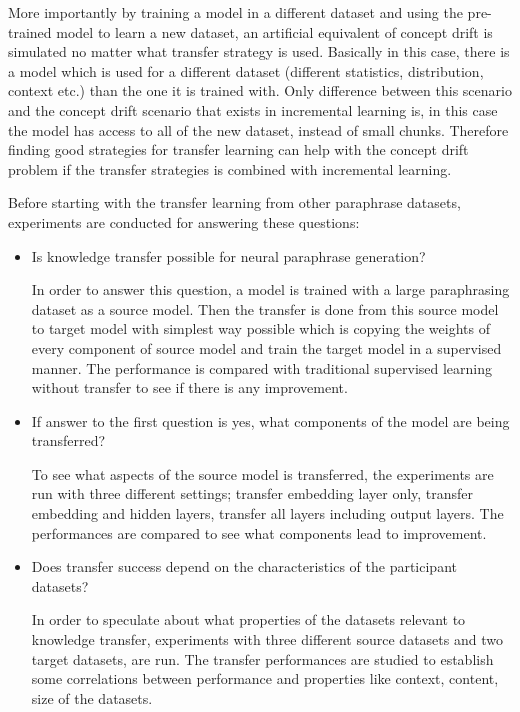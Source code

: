 More importantly by training a model in a different dataset and using the pre-trained model to learn a new dataset, an artificial equivalent of concept drift is simulated no matter what transfer strategy is used. Basically in this case, there is a model which is used for a different dataset (different statistics, distribution, context etc.) than the one it is trained with. Only difference between this scenario and the concept drift scenario that exists in incremental learning is, in this case the model has access to all of the new dataset, instead of small chunks. Therefore finding good strategies for transfer learning can help with the concept drift problem if the transfer strategies is combined with incremental learning. 

Before starting with the transfer learning from other paraphrase datasets, experiments are conducted for answering these questions:

\begin{itemize}

\item Is knowledge transfer possible for neural paraphrase generation?

In order to answer this question, a model is trained with a large paraphrasing dataset as a source model. Then the transfer is done from this source model to target model with simplest way possible which is copying the weights of every component of source model and train the target model in a supervised manner. The performance is compared with traditional supervised learning without transfer to see if there is any improvement.

\item If answer to the first question is yes, what components of the model are being transferred?

To see what aspects of the source model is transferred, the experiments are run with three different settings; transfer embedding layer only, transfer embedding and hidden layers, transfer all layers including output layers. The performances are compared to see what components lead to improvement. 

\item Does transfer success depend on the characteristics of the participant datasets?

In order to speculate about what properties of the datasets relevant to knowledge transfer, experiments with three different source datasets and two target datasets, are run. The transfer performances are studied to establish some correlations between performance and properties like context, content, size of the datasets.

\end{itemize}

